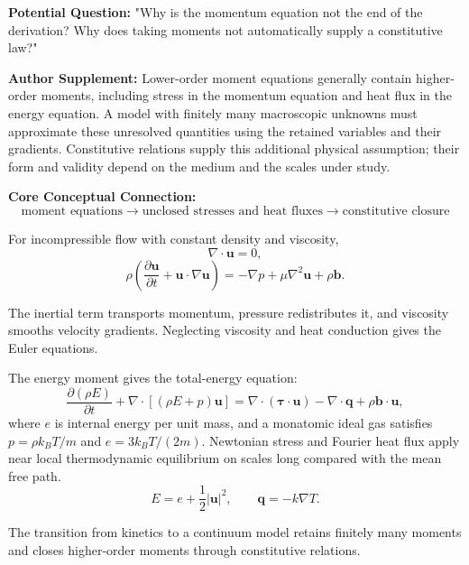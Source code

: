 \begin{authornote}
\textbf{Potential Question:}
"Why is the momentum equation not the end of the derivation? Why does taking moments not automatically supply a constitutive law?"

\textbf{Author Supplement:}
Lower-order moment equations generally contain higher-order moments, including stress in the momentum equation and heat flux in the energy equation. A model with finitely many macroscopic unknowns must approximate these unresolved quantities using the retained variables and their gradients. Constitutive relations supply this additional physical assumption; their form and validity depend on the medium and the scales under study.

\textbf{Core Conceptual Connection:}
\[
\text{moment equations}
\longrightarrow
\text{unclosed stresses and heat fluxes}
\longrightarrow
\text{constitutive closure}
\]
\end{authornote}


For incompressible flow with constant density and viscosity,
\[
\nabla\cdot\bm u=0,
\]
\[
\rho\left(
\frac{\partial\bm u}{\partial t}
+\bm u\cdot\nabla\bm u
\right)
=
-\nabla p+\mu\nabla^2\bm u+\rho\bm b.
\]

The inertial term transports momentum, pressure redistributes it, and viscosity smooths velocity gradients. Neglecting viscosity and heat conduction gives the Euler equations.

The energy moment gives the total-energy equation:
\[
\frac{\partial(\rho E)}{\partial t}
+
\nabla\cdot[(\rho E+p)\bm u]
=
\nabla\cdot(\bm\tau\cdot\bm u)
-\nabla\cdot\bm q
+\rho\bm b\cdot\bm u,
\]
where $e$ is internal energy per unit mass, and a monatomic ideal gas satisfies $p=\rho k_BT/m$ and $e=3k_BT/(2m)$. Newtonian stress and Fourier heat flux apply near local thermodynamic equilibrium on scales long compared with the mean free path.
\[
E=e+\frac12|\bm u|^2,
\qquad
\bm q=-k\nabla T.
\]

The transition from kinetics to a continuum model retains finitely many moments and closes higher-order moments through constitutive relations.
